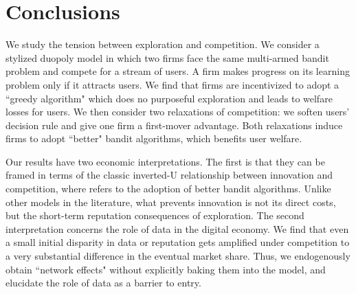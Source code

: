 \documentclass[../competing_bandits.tex]{subfiles}
\begin{document}
\section{Conclusions}\label{sec:conclusion}

We study the tension between exploration and competition. We consider a stylized duopoly model in which two firms face the same multi-armed bandit problem and compete for a stream of users. A firm makes progress on its learning problem only if it attracts users.
We find that firms are incentivized to adopt a ``greedy algorithm" which does no purposeful exploration and leads to welfare losses for users. We then consider two relaxations of competition: we soften users' decision rule and give one firm a first-mover advantage. Both relaxations induce firms to adopt ``better" bandit algorithms, which benefits user welfare.


Our results have two economic interpretations. The first is that they can be framed in terms of the classic inverted-U relationship between innovation and competition, where \innovation refers to the adoption of better bandit algorithms. Unlike other models in the literature, what prevents innovation is not its direct costs, but the short-term reputation consequences of exploration. The second interpretation concerns the role of data in the digital economy. We find that even a small initial disparity in data or reputation gets amplified under competition to a very substantial difference in the eventual market share. Thus, we endogenously obtain ``network effects" without explicitly baking them into the model, and elucidate the role of data as a barrier to entry.
\end{document}
